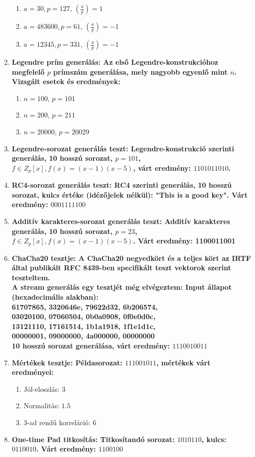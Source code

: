 \documentclass[hidelinks, 12pt]{article}
\begin{document}
\begin{enumerate}
\begin{enumerate}
		\item $a = 30, p = 127$, $\left({\frac{a}{p}}\right) = 1$
		\item $a = 483600, p = 61$, $\left({\frac{a}{p}}\right) = -1$
		\item $a = 12345, p = 331$, $\left({\frac{a}{p}}\right) = -1$
	\end{enumerate}
	\item \bfseries Legendre prím generálás:
	\normalfont Az első Legendre-konstrukcióhoz megfelelő $p$ prímszám generálása, mely nagyobb egyenlő mint $n$. Vizsgált esetek és eredmények:
	\begin{enumerate}
		\item $n = 100$, $p = 101$
		\item $n = 200$, $p = 211$
		\item $n = 20000$, $p = 20029$
	\end{enumerate}
	\item  \bfseries Legendre-sorozat generálás teszt:
	\normalfont Legendre-konstrukció szerinti generálás, 10 hosszú sorozat, $p = 101$, $f \in Z_p[x], f(x) = (x-1)(x-5)$, várt eredmény:	$1101011010$.
	\item \bfseries RC4-sorozat generálás teszt:
	\normalfont RC4 szerinti generálás, 10 hosszú sorozat, kulcs értéke (idézőjelek nélkül): "This is a good key". Várt eredmény: $0001111100$
	\item \bfseries Additív karakteres-sorozat generálás teszt:
	\normalfont Additív karakteres generálás, 10 hosszú sorozat, $p = 23$, $f \in Z_p[x], f(x) = (x-1)(x-5)$. Várt eredmény: 1100011001
	\item \bfseries ChaCha20 tesztje:
	\normalfont  A ChaCha20 negyedkört és a teljes kört az IRTF által publikált RFC 8439-ben specifikált teszt vektorok szerint teszteltem.
	\\ A stream generálás egy tesztjét még elvégeztem:
	Input állapot (hexadecimális alakban): \\
	    61707865, 3320646e, 79622d32, 6b206574, \\
		03020100, 07060504, 0b0a0908, 0f0e0d0c, \\
		13121110, 17161514, 1b1a1918, 1f1e1d1c, \\
		00000001, 09000000, 4a000000, 00000000 \\
	10 hosszú sorozat generálása, várt eredmény: $1110010011$
	\item \bfseries Mértékek tesztje:
	\normalfont Példasorozat: $111001011$, mértékek várt eredményei:
	\begin{enumerate}
		\item Jól-eloszlás: $3$
		\item Normalitás: $1.5$
		\item 3-ad rendű korreláció: 6
	\end{enumerate}
\item \bfseries One-time Pad titkosítás:
\normalfont Titkosítandó sorozat: $1010110$, kulcs: $0110010$. Várt eredmény: $1100100$
\end{enumerate}
\end{document}
